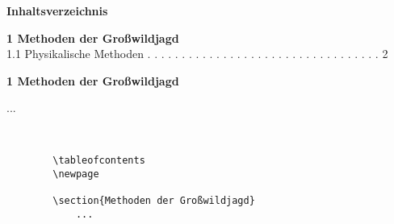 \begin{frame}[fragile]
	\Losung
	\begin{outputbox}
		{\large\textbf{Inhaltsverzeichnis}}
		
		{\textbf{1 \hspace{4pt} Methoden der Großwildjagd}} \\
		{\hspace{12pt} 1.1 Physikalische Methoden . . . . . . . . . . . . . . . . . . . . . . . . . . . . . . . . . . \hspace{4pt}  2}
	\end{outputbox}
	\linebreakrule
	\begin{outputbox}
		{ \LARGE\textbf{1 Methoden der Großwildjagd}}
		
		...
	\end{outputbox}

	\Code
	\begin{lstlisting}[gobble=8]
		
			
		\tableofcontents
		\newpage 
			
		\section{Methoden der Großwildjagd}
			...
	\end{lstlisting}
\end{frame}
